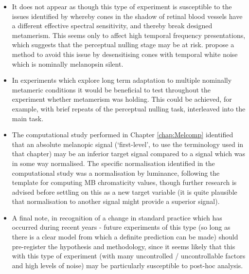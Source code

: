 \begin{itemize}
\item It does not appear as though this type of experiment is susceptible to the issues identified by \citet{spitschan_selective_2015} whereby cones in the shadow of retinal blood vessels have a different effective spectral sensitivity, and thereby break designed metamerism. This seems only to affect high temporal frequency presentations, which suggests that the perceptual nulling stage may be at risk. \citet{zele_melanopsin_2018} propose a method to avoid this issue by desensitising cones with temporal white noise which is nominally melanopsin silent.
\item In experiments which explore long term adaptation to multiple nominally metameric conditions it would be beneficial to test throughout the experiment whether metamerism was holding. This could be achieved, for example, with brief repeats of the perceptual nulling task, interleaved into the main task.
\item The computational study performed in Chapter \ref{chap:Melcomp} identified that an absolute melanopic signal (`first-level', to use the terminology used in that chapter) may be an inferior target signal compared to a signal which was in some way normalised. The specific normalisation identified in the computational study was a normalisation by luminance, following the template for computing \gls{MB} chromaticity values, though further research is advised before settling on this as a new target variable (it is quite plausible that normalisation to another signal might provide a superior signal).
\item A final note, in recognition of a change in standard practice which has occurred during recent years - future experiments of this type (so long as there is a clear model from which a definite prediction can be made) should pre-register the hypothesis and methodology, since it seems likely that this with this type of experiment (with many uncontrolled / uncontrollable factors and high levels of noise) may be particularly susceptible to post-hoc analysis.
\end{itemize}





